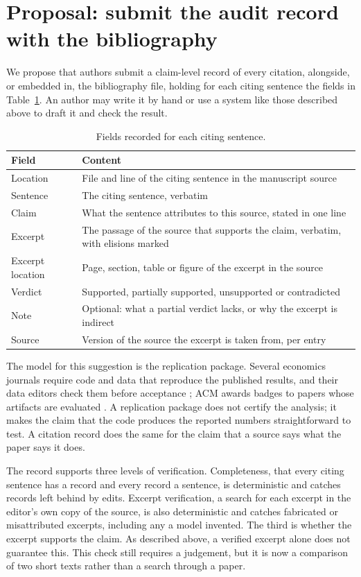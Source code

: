 \documentclass[11pt]{article}
\begin{document}
\section{Proposal: submit the audit record with the bibliography}

We propose that authors submit a claim-level record of every citation, alongside, or embedded in, the bibliography file, holding for each citing sentence the fields in Table~\ref{tab:fields}. An author may write it by hand or use a system like those described above to draft it and check the result.

\begin{table}[t]
\centering
\caption{Fields recorded for each citing sentence.}
\label{tab:fields}
\begin{tabularx}{\linewidth}{@{}lX@{}}
\toprule
Field & Content \\
\midrule
Location & File and line of the citing sentence in the manuscript source \\
Sentence & The citing sentence, verbatim \\
Claim & What the sentence attributes to this source, stated in one line \\
Excerpt & The passage of the source that supports the claim, verbatim, with elisions marked \\
Excerpt location & Page, section, table or figure of the excerpt in the source \\
Verdict & Supported, partially supported, unsupported or contradicted \\
Note & Optional: what a partial verdict lacks, or why the excerpt is indirect \\
Source & Version of the source the excerpt is taken from, per entry \\
\bottomrule
\end{tabularx}
\end{table}

The model for this suggestion is the replication package. Several economics journals require code and data that reproduce the published results, and their data editors check them before acceptance \citep{aea2026datapolicy,es2026reproducibility}; ACM awards badges to papers whose artifacts are evaluated \citep{acm2020badging}. A replication package does not certify the analysis; it makes the claim that the code produces the reported numbers straightforward to test. A citation record does the same for the claim that a source says what the paper says it does.

The record supports three levels of verification. Completeness, that every citing sentence has a record and every record a sentence, is deterministic and catches records left behind by edits. Excerpt verification, a search for each excerpt in the editor's own copy of the source, is also deterministic and catches fabricated or misattributed excerpts, including any a model invented. The third is whether the excerpt supports the claim. As described above, a verified excerpt alone does not guarantee this. This check still requires a judgement, but it is now a comparison of two short texts rather than a search through a paper.
\end{document}
